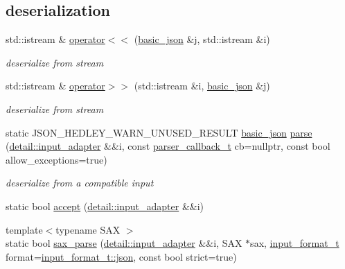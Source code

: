 \subsection*{deserialization}
\begin{DoxyCompactItemize}
\item 
std\+::istream \& \hyperlink{classnlohmann_1_1basic__json_a60ca396028b8d9714c6e10efbf475af6}{operator$<$$<$} (\hyperlink{classnlohmann_1_1basic__json}{basic\+\_\+json} \&j, std\+::istream \&i)
\begin{DoxyCompactList}\small\item\em deserialize from stream \end{DoxyCompactList}\item 
std\+::istream \& \hyperlink{classnlohmann_1_1basic__json_aaf363408931d76472ded14017e59c9e8}{operator$>$$>$} (std\+::istream \&i, \hyperlink{classnlohmann_1_1basic__json}{basic\+\_\+json} \&j)
\begin{DoxyCompactList}\small\item\em deserialize from stream \end{DoxyCompactList}\item 
static J\+S\+O\+N\+\_\+\+H\+E\+D\+L\+E\+Y\+\_\+\+W\+A\+R\+N\+\_\+\+U\+N\+U\+S\+E\+D\+\_\+\+R\+E\+S\+U\+LT \hyperlink{classnlohmann_1_1basic__json}{basic\+\_\+json} \hyperlink{classnlohmann_1_1basic__json_a265a473e939184aa42655c9ccdf34e58}{parse} (\hyperlink{classnlohmann_1_1detail_1_1input__adapter}{detail\+::input\+\_\+adapter} \&\&i, const \hyperlink{classnlohmann_1_1basic__json_ab4f78c5f9fd25172eeec84482e03f5b7}{parser\+\_\+callback\+\_\+t} cb=nullptr, const bool allow\+\_\+exceptions=true)
\begin{DoxyCompactList}\small\item\em deserialize from a compatible input \end{DoxyCompactList}\item 
static bool \hyperlink{classnlohmann_1_1basic__json_a875585b0cb6133902066daccd7c9d420}{accept} (\hyperlink{classnlohmann_1_1detail_1_1input__adapter}{detail\+::input\+\_\+adapter} \&\&i)
\item 
{\footnotesize template$<$typename S\+AX $>$ }\\static bool \hyperlink{classnlohmann_1_1basic__json_a8a3dd150c2d1f0df3502d937de0871db}{sax\+\_\+parse} (\hyperlink{classnlohmann_1_1detail_1_1input__adapter}{detail\+::input\+\_\+adapter} \&\&i, S\+AX $\ast$sax, \hyperlink{namespacenlohmann_1_1detail_aa554fc6a11519e4f347deb25a9f0db40}{input\+\_\+format\+\_\+t} format=\hyperlink{_json_utilization_8h_ab701e3ac61a85b337ec5c1abaad6742d}{input\+\_\+format\+\_\+t\+::json}, const bool strict=true)

\end{DoxyCompactItemize}
